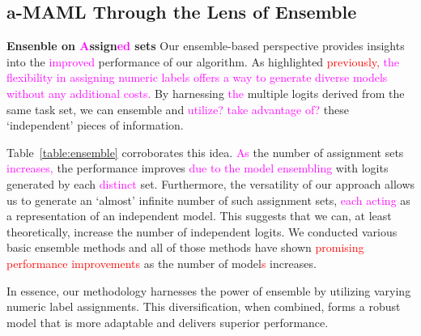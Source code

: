\documentclass[letterpaper]{article} %
\newcommand{\nj}[1]{\textcolor{red}{#1}}
\newcommand{\jh}[1]{\textcolor{blue}{#1}}
\newcommand{\yr}[1]{\textcolor{magenta}{#1}}
\begin{document}
{\subsection{a-MAML Through the Lens of Ensemble}
\textbf{Ensenble on \yr{A}ssign\yr{ed} sets} Our ensemble-based perspective provides insights into the \yr{improved} performance of our algorithm. As highlighted \nj{previously,} %
\yr{the flexibility in assigning numeric labels offers a way to generate diverse models without any additional costs.}
By harnessing \yr{the} multiple logits derived from the same task set, we can ensemble and \yr{utilize? take advantage of?} %
these `independent' pieces of information.

Table~\ref{table:ensemble} corroborates this idea. \yr{As} the number of assignment sets \yr{increases,} %
the performance improves \yr{due to the model ensembling} with logits generated by each \yr{distinct} set. Furthermore, the versatility of our approach allows us to generate an `almost' infinite number of such assignment sets, \yr{each acting} %
as a representation of an independent model. This suggests that we can, at least theoretically, increase the number of independent logits. We conducted various basic ensemble methods and all of those methods have shown \nj{promising performance improvements} as the number of model\nj{s} increases.


In essence, our methodology harnesses the power of ensemble by utilizing varying numeric label assignments. This diversification, when combined, forms a robust model that is more adaptable and delivers superior performance.

}
\end{document}
